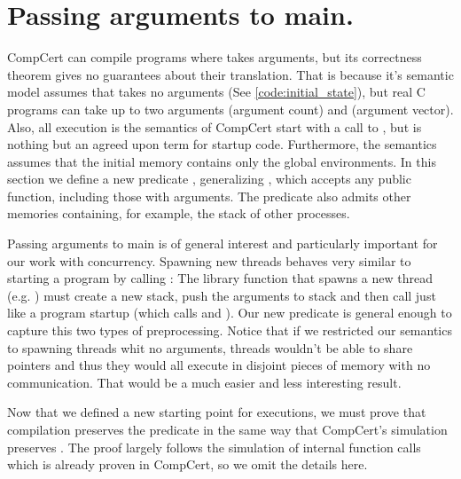 \section{Passing arguments to main.}\label{sec:premain}

CompCert can compile programs where  takes arguments, but its correctness theorem gives no guarantees about their translation. That is because it's semantic model assumes that  takes no arguments (See \ref{code:initial_state}), but real C programs can take up to two arguments  (argument count) and  (argument vector). Also, all execution is the semantics of CompCert start with a call to , but  is nothing but an agreed upon term for startup code. Furthermore, the semantics assumes that the initial memory contains only the global environments. In this section we define a new predicate , generalizing , which accepts any public function, including those with arguments. The predicate also admits other memories containing, for example, the stack of other processes. 

Passing arguments to main is of general interest and particularly important for our work with concurrency. Spawning new threads behaves very similar to starting a program by calling : The library function that spawns a new thread  (e.g. ) must create a new stack, push the arguments to stack and then call  just like a program startup (which calls  and ). Our new predicate  is general enough to capture this two types of preprocessing.
Notice that if we restricted our semantics to spawning threads whit no arguments, threads wouldn't be able to share pointers and thus they would all execute in disjoint pieces of memory with no communication. That would be a much easier and less interesting result. 

Now that we defined a new starting point for executions, we must prove that compilation preserves the predicate  in the same way that CompCert's simulation preserves . The proof largely follows the simulation of internal function calls which is already proven in CompCert, so we omit the details here. 

